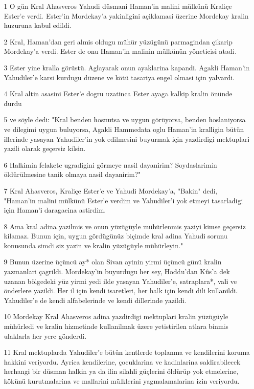 \par 1 O gün Kral Ahasveros Yahudi düsmani Haman'in malini mülkünü Kraliçe Ester'e verdi. Ester'in Mordekay'a yakinligini açiklamasi üzerine Mordekay kralin huzuruna kabul edildi.
\par 2 Kral, Haman'dan geri almis oldugu mühür yüzügünü parmagindan çikarip Mordekay'a verdi. Ester de onu Haman'in malinin mülkünün yöneticisi atadi.
\par 3 Ester yine kralla görüstü. Aglayarak onun ayaklarina kapandi. Agakli Haman'in Yahudiler'e karsi kurdugu düzene ve kötü tasariya engel olmasi için yalvardi.
\par 4 Kral altin asasini Ester'e dogru uzatinca Ester ayaga kalkip kralin önünde durdu
\par 5 ve söyle dedi: "Kral benden hosnutsa ve uygun görüyorsa, benden hoslaniyorsa ve dilegimi uygun buluyorsa, Agakli Hammedata oglu Haman'in kralligin bütün illerinde yasayan Yahudiler'in yok edilmesini buyurmak için yazdirdigi mektuplari yazili olarak geçersiz kilsin.
\par 6 Halkimin felakete ugradigini görmeye nasil dayanirim? Soydaslarimin öldürülmesine tanik olmaya nasil dayanirim?"
\par 7 Kral Ahasveros, Kraliçe Ester'e ve Yahudi Mordekay'a, "Bakin" dedi, "Haman'in malini mülkünü Ester'e verdim ve Yahudiler'i yok etmeyi tasarladigi için Haman'i daragacina astirdim.
\par 8 Ama kral adina yazilmis ve onun yüzügüyle mühürlenmis yaziyi kimse geçersiz kilamaz. Bunun için, uygun gördügünüz biçimde kral adina Yahudi sorunu konusunda simdi siz yazin ve kralin yüzügüyle mühürleyin."
\par 9 Bunun üzerine üçüncü ay* olan Sivan ayinin yirmi üçüncü günü kralin yazmanlari çagrildi. Mordekay'in buyurdugu her sey, Hoddu'dan Kûs'a dek uzanan bölgedeki yüz yirmi yedi ilde yasayan Yahudiler'e, satraplara*, vali ve önderlere yazildi. Her il için kendi isaretleri, her halk için kendi dili kullanildi. Yahudiler'e de kendi alfabelerinde ve kendi dillerinde yazildi.
\par 10 Mordekay Kral Ahasveros adina yazdirdigi mektuplari kralin yüzügüyle mühürledi ve kralin hizmetinde kullanilmak üzere yetistirilen atlara binmis ulaklarla her yere gönderdi.
\par 11 Kral mektuplarda Yahudiler'e bütün kentlerde toplanma ve kendilerini koruma hakkini veriyordu. Ayrica kendilerine, çocuklarina ve kadinlarina saldirabilecek herhangi bir düsman halkin ya da ilin silahli güçlerini öldürüp yok etmelerine, kökünü kurutmalarina ve mallarini mülklerini yagmalamalarina izin veriyordu.
